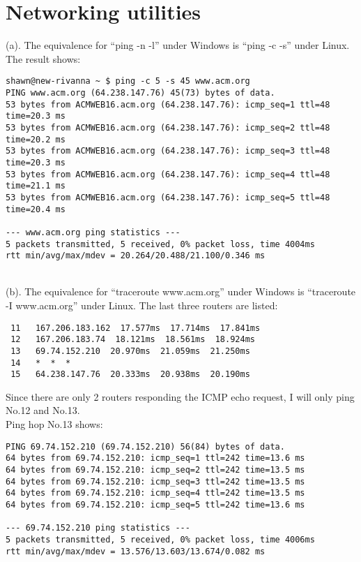 \documentclass[paper=a4, fontsize=11pt]{scrartcl} %
\numberwithin{equation}{section} %
\numberwithin{figure}{section} %
\numberwithin{table}{section} %
\begin{document}

\section*{Networking utilities}
(a). The equivalence for ``ping -n -l'' under Windows is ``ping -c -s'' under Linux.
The result shows:
\begin{lstlisting}
shawn@new-rivanna ~ $ ping -c 5 -s 45 www.acm.org
PING www.acm.org (64.238.147.76) 45(73) bytes of data.
53 bytes from ACMWEB16.acm.org (64.238.147.76): icmp_seq=1 ttl=48 time=20.3 ms
53 bytes from ACMWEB16.acm.org (64.238.147.76): icmp_seq=2 ttl=48 time=20.2 ms
53 bytes from ACMWEB16.acm.org (64.238.147.76): icmp_seq=3 ttl=48 time=20.3 ms
53 bytes from ACMWEB16.acm.org (64.238.147.76): icmp_seq=4 ttl=48 time=21.1 ms
53 bytes from ACMWEB16.acm.org (64.238.147.76): icmp_seq=5 ttl=48 time=20.4 ms

--- www.acm.org ping statistics ---
5 packets transmitted, 5 received, 0% packet loss, time 4004ms
rtt min/avg/max/mdev = 20.264/20.488/21.100/0.346 ms
\end{lstlisting}
~\\[18pt]
(b). The equivalence for ``traceroute www.acm.org'' under Windows is ``traceroute -I www.acm.org'' under Linux.
The last three routers are listed:
\begin{lstlisting}
 11   167.206.183.162  17.577ms  17.714ms  17.841ms 
 12   167.206.183.74  18.121ms  18.561ms  18.924ms 
 13   69.74.152.210  20.970ms  21.059ms  21.250ms 
 14   *  *  * 
 15   64.238.147.76  20.333ms  20.938ms  20.190ms
\end{lstlisting}
Since there are only 2 routers responding the ICMP echo request, I will only ping No.12 and No.13. \\
Ping hop No.13 shows:
\begin{lstlisting}
PING 69.74.152.210 (69.74.152.210) 56(84) bytes of data.
64 bytes from 69.74.152.210: icmp_seq=1 ttl=242 time=13.6 ms
64 bytes from 69.74.152.210: icmp_seq=2 ttl=242 time=13.5 ms
64 bytes from 69.74.152.210: icmp_seq=3 ttl=242 time=13.5 ms
64 bytes from 69.74.152.210: icmp_seq=4 ttl=242 time=13.5 ms
64 bytes from 69.74.152.210: icmp_seq=5 ttl=242 time=13.6 ms

--- 69.74.152.210 ping statistics ---
5 packets transmitted, 5 received, 0% packet loss, time 4006ms
rtt min/avg/max/mdev = 13.576/13.603/13.674/0.082 ms
\end{lstlisting}
\end{document}
